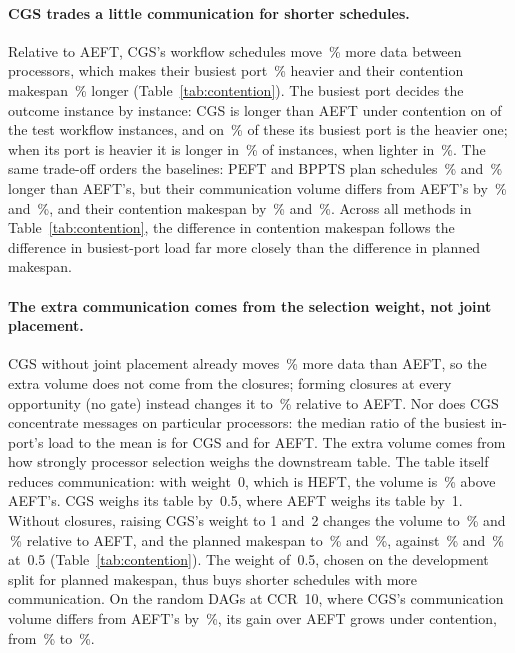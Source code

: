 \paragraph{CGS trades a little communication for shorter schedules.}
Relative to AEFT, CGS's workflow schedules move \WCWfCgsVol\,\% more data between processors, which makes their
busiest port \WCWfCgsPort\,\% heavier and their contention makespan \WCWfCgsCont\,\% longer
(Table~\ref{tab:contention}). The busiest port decides the outcome instance by instance: CGS is longer than AEFT
under contention on \WCWfLose{} of the \WCWfN{} test workflow instances, and on \WCWfLoseHeavy\,\% of these its
busiest port is the heavier one; when its port is heavier it is longer in \WCWfLoseIfHeavy\,\% of instances,
when lighter in \WCWfLoseIfLight\,\%. The same trade-off orders the baselines: PEFT and BPPTS plan schedules
\WCWfPeftPlanned\,\% and \WCWfBpptsPlanned\,\% longer than AEFT's, but their communication volume differs from
AEFT's by \WCWfPeftVol\,\% and \WCWfBpptsVol\,\%, and their contention makespan by \WCWfPeftCont\,\% and
\WCWfBpptsCont\,\%. Across all methods in Table~\ref{tab:contention}, the difference in contention makespan follows the
difference in busiest-port load far more closely than the difference in planned makespan.

\paragraph{The extra communication comes from the selection weight, not joint placement.}
CGS without joint placement already moves \WCWfCgsSingleVol\,\% more data than AEFT, so the extra volume does not
come from the closures; forming closures at every opportunity (no gate) instead changes it to
\WCWfCgsNogateVol\,\% relative to AEFT. Nor does CGS concentrate messages on particular processors: the median
ratio of the busiest in-port's load to the mean is \WCWfCgsInConc{} for CGS and \WCWfAeftInConc{} for AEFT. The
extra volume comes from how strongly processor selection weighs the downstream table. The table itself reduces
communication: with weight~0, which is HEFT, the volume is \WCWfHeftVol\,\% above AEFT's. CGS weighs its table
by~0.5, where AEFT weighs its table by~1. Without closures, raising CGS's weight to 1 and~2 changes the volume
to \WCWfWeightOneVol\,\% and \WCWfWeightTwoVol\,\% relative to AEFT, and the planned makespan to
\WCWfWeightOnePlanned\,\% and \WCWfWeightTwoPlanned\,\%, against \WCWfCgsSingleVol\,\% and
\WCWfCgsSinglePlanned\,\% at~0.5 (Table~\ref{tab:contention}). The weight of~0.5, chosen on the development split
for planned makespan, thus buys shorter schedules with more communication. On the random DAGs at CCR~10, where CGS's communication volume differs from
AEFT's by \WCRHighCgsVol\,\%, its gain over AEFT grows under contention, from \WCRHighAeftGainPlan\,\% to \WCRHighAeftGainCont\,\%.

